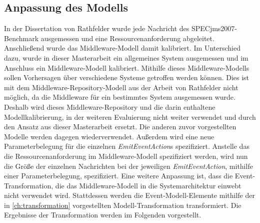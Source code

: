\subsection{Anpassung des Modells}
In der Dissertation von Rathfelder \cite{Rathfelder2013} wurde jede Nachricht des SPECjms2007-Benchmark ausgemessen und eine Ressourcenanforderung abgeleitet. Anschließend wurde das Middleware-Modell damit kalibriert. Im Unterschied dazu, wurde in dieser Masterarbeit ein allgemeines System ausgemessen und im Anschluss ein Middleware-Modell kalibriert. Mithilfe dieses Middleware-Modells sollen Vorhersagen über verschiedene Systeme getroffen werden können. Dies ist mit dem Middleware-Repository-Modell aus der Arbeit von Rathfelder nicht möglich, da die Middleware für ein bestimmtes System ausgemessen wurde. Deshalb wird dieses Middleware-Repository und die darin enthaltene Modellkalibrierung, in der weiteren Evaluierung nicht weiter verwendet und durch den Ansatz aus dieser Masterarbeit ersetzt. 
Die anderen zuvor vorgestellten Modelle werden dagegen wiederverwendet. Außerdem wird eine neue Parameterbelegung für die einzelnen \emph{EmitEventAction}s spezifiziert. Anstelle das die Ressourcenanforderung im Middleware-Modell spezifiziert werden, wird nun die Größe der einzelnen Nachrichten bei der jeweiligen \emph{EmitEventAction}, mithilfe einer Parameterbelegung, spezifiziert. Eine weitere Anpassung ist, dass die Event-Transformation, die das Middleware-Modell in die Systemarchitektur einwebt nicht verwendet wird. Stattdessen werden die Event-Modell-Elemente mithilfe der in \autoref{ch:transformation} vorgestellten Modell-Transformation transformiert. Die Ergebnisse der Transformation werden im Folgenden vorgestellt.






